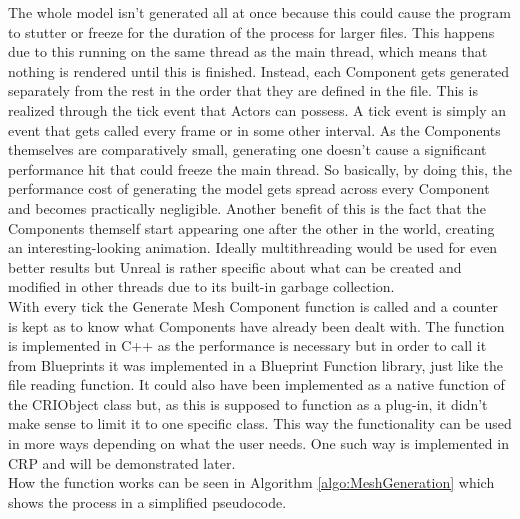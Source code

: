 The whole model isn't generated all at once because this could cause the program to stutter or freeze for the duration of the process for larger files. This happens due to this running on the same thread as the main thread, which means that nothing is rendered until this is finished. Instead, each Component gets generated separately from the rest in the order that they are defined in the file. This is realized through the tick event that Actors can possess. A tick event is simply an event that gets called every frame or in some other interval. As the Components themselves are comparatively small, generating one doesn't cause a significant performance hit that could freeze the main thread. So basically, by doing this, the performance cost of generating the model gets spread across every Component and becomes practically negligible. Another benefit of this is the fact that the Components themself start appearing one after the other in the world, creating an interesting-looking animation. Ideally multithreading would be used for even better results but Unreal is rather specific about what can be created and modified in other threads due to its built-in garbage collection\cite{bib:MultiThread}.\\
With every tick the Generate Mesh Component function is called and a counter is kept as to know what Components have already been dealt with. The function is implemented in C++ as the performance is necessary but in order to call it from Blueprints it was implemented in a Blueprint Function library, just like the file reading function. It could also have been implemented as a native function of the CRIObject class but, as this is supposed to function as a plug-in, it didn't make sense to limit it to one specific class. This way the functionality can be used in more ways depending on what the user needs. One such way is implemented in \acs{CRP} and will be demonstrated later.\\
How the function works can be seen in Algorithm \ref{algo:MeshGeneration} which shows the process in a simplified pseudocode.

